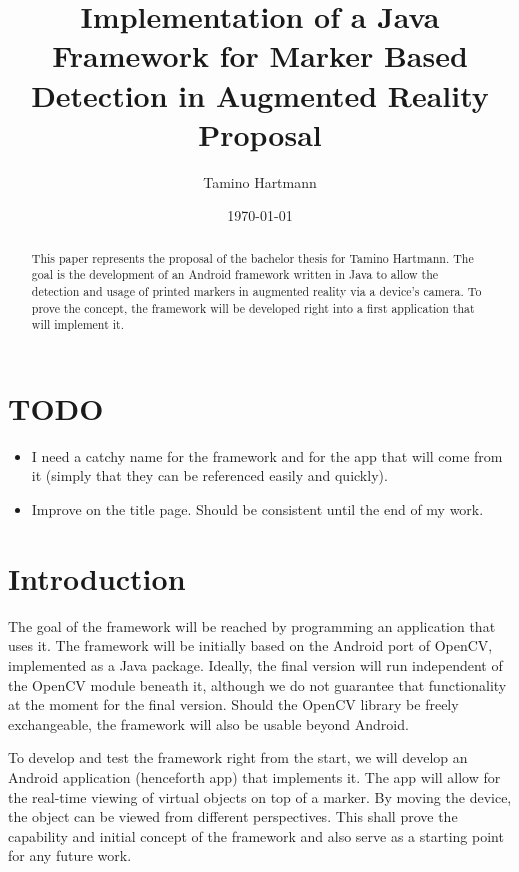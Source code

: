 \documentclass[a4paper]{article}
\begin{document}
\title{Implementation of a Java Framework for Marker Based Detection in Augmented Reality \\ {\large Proposal}}
\author{Tamino Hartmann}
\date{\today}

\maketitle

\begin{abstract}
This paper represents the proposal of the bachelor thesis for Tamino Hartmann.
The goal is the development of an Android framework written in Java to allow the detection and usage of printed markers in augmented reality via a device's camera.
To prove the concept, the framework will be developed right into a first application that will implement it.
\end{abstract}

\newpage

\tableofcontents

\newpage

\section{TODO}

\begin{itemize}
	\item I need a catchy name for the framework and for the app that will come from it (simply that they can be referenced easily and quickly).
	\item Improve on the title page. Should be consistent until the end of my work.
\end{itemize}

\section{Introduction}

The goal of the framework will be reached by programming an application that uses it.
The framework will be initially based on the Android port\cite{opencvandroid} of OpenCV\cite{opencv}, implemented as a Java package.
Ideally, the final version will run independent of the OpenCV module beneath it, although we do not guarantee that functionality at the moment for the final version.
Should the OpenCV library be freely exchangeable, the framework will also be usable beyond Android.

To develop and test the framework right from the start, we will develop an Android application (henceforth app) that implements it.
The app will allow for the real-time viewing of virtual objects on top of a marker.
By moving the device, the object can be viewed from different perspectives.
This shall prove the capability and initial concept of the framework and also serve as a starting point for any future work.
\end{document}
